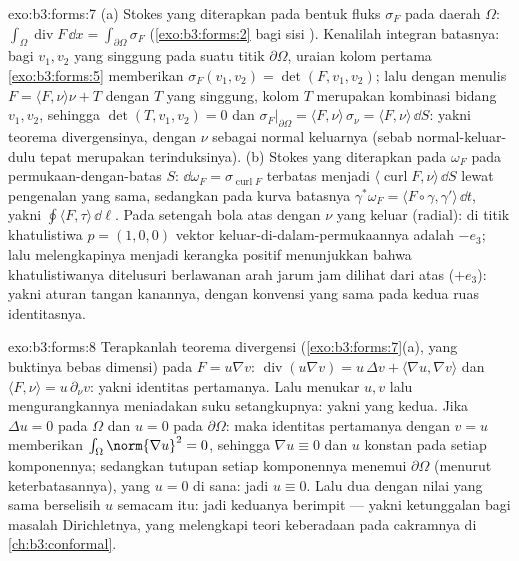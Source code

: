 \begin{solution}{exo:b3:forms:7}
(a) Stokes yang diterapkan pada bentuk fluks $\sigma_F$ pada
daerah  $\Omega$:
$\int_\Omega\operatorname{div}F\,\dd x =
\int_{\partial\Omega}\sigma_F$ (\cref{exo:b3:forms:2} bagi
sisi ). Kenalilah integran batasnya: bagi
$v_1, v_2$ yang singgung pada suatu titik $\partial\Omega$,
uraian kolom pertama \cref{exo:b3:forms:5} memberikan
$\sigma_F(v_1, v_2) = \det(F, v_1, v_2)$; lalu dengan menulis $F =
\langle F, \nu\rangle\nu + T$ dengan $T$ yang singgung, kolom
$T$ merupakan kombinasi bidang $v_1, v_2$, sehingga $\det(T,
v_1, v_2) = 0$ dan
$\sigma_F\vert_{\partial\Omega} = \langle F,
\nu\rangle\,\sigma_\nu = \langle F, \nu\rangle\,\dd S$: yakni
teorema divergensinya, dengan $\nu$ sebagai normal keluarnya
(sebab normal-keluar-dulu tepat merupakan  terinduksinya).
(b) Stokes yang diterapkan pada $\omega_F$ pada
permukaan-dengan-batas $S$: $\dd\omega_F =
\sigma_{\operatorname{curl}F}$ terbatas menjadi
$\langle\operatorname{curl}F, \nu\rangle\,\dd S$ lewat pengenalan
yang sama, sedangkan pada kurva batasnya
$\gamma^*\omega_F = \langle F\circ\gamma,
\gamma'\rangle\,\dd t$, yakni $\oint\langle F,
\tau\rangle\,\dd\ell$. Pada setengah bola atas dengan $\nu$ yang
keluar (radial): di titik khatulistiwa $p = (1,0,0)$
vektor keluar-di-dalam-permukaannya adalah $-e_3$; lalu melengkapinya
menjadi kerangka positif menunjukkan bahwa khatulistiwanya ditelusuri
berlawanan arah jarum jam dilihat dari atas ($+e_3$): yakni aturan tangan
kanannya, dengan konvensi yang sama pada kedua ruas identitasnya.
\end{solution}

\begin{solution}{exo:b3:forms:8}
Terapkanlah teorema divergensi (\cref{exo:b3:forms:7}(a),
yang buktinya bebas dimensi) pada $F = u\nabla v$:
$\operatorname{div}(u\nabla v) = u\,\Delta v + \langle\nabla
u, \nabla v\rangle$ dan $\langle F, \nu\rangle =
u\,\partial_\nu v$: yakni identitas pertamanya. Lalu menukar $u, v$ lalu
mengurangkannya meniadakan suku setangkupnya: yakni yang kedua. Jika
$\Delta u = 0$ pada $\Omega$ dan $u = 0$ pada $\partial\Omega$:
maka identitas pertamanya dengan $v = u$ memberikan
$\int_\Omega\norm{\nabla u}^2 = 0$, sehingga $\nabla u \equiv 0$
dan $u$ konstan pada setiap komponennya; sedangkan tutupan setiap
komponennya menemui $\partial\Omega$ (menurut keterbatasannya), yang $u = 0$ di sana:
jadi $u \equiv 0$. Lalu dua  dengan nilai 
yang sama berselisih $u$ semacam itu: jadi keduanya berimpit --- yakni ketunggalan
bagi masalah Dirichletnya, yang melengkapi teori keberadaan
pada cakramnya di \cref{ch:b3:conformal}.
\end{solution}


